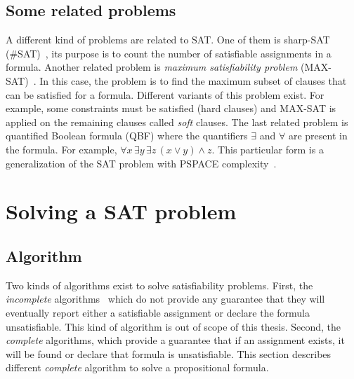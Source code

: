 \subsection{Some related problems}
A different kind of problems are related to SAT.
One of them is sharp-SAT (\#SAT)~\cite{valiant1979complexity}, its purpose is to count the number of satisfiable assignments in a formula.
Another related problem is \textit{maximum satisfiability problem} (MAX-SAT)~\cite{biere2009handbook}. In this case, the problem
is to find the maximum subset of clauses that can be satisfied for a formula. Different variants
of this problem exist. For example, some constraints must be satisfied (hard clauses) and MAX-SAT
is applied on the remaining clauses called \emph{soft} clauses.
The last related problem is quantified Boolean formula (QBF) where the quantifiers $\exists$ and
$\forall$ are present in the formula. For example, $\forall x\, \exists y\, \exists z \, (x \lor y) \land z$.
This particular form is a generalization of the SAT problem with PSPACE complexity~\cite{garey2002computers}.


\clearpage
\section{Solving a SAT problem}

\subsection{Algorithm}

Two kinds of algorithms exist to solve satisfiability problems.
First, the \emph{incomplete} algorithms~\cite{kautz2009incomplete} which do not provide any guarantee that they will eventually report
either a satisfiable assignment or declare the formula unsatisfiable. This kind of algorithm is out of scope of this thesis. 
Second, the \emph{complete} algorithms, which provide a guarantee that if an assignment exists,
it will be found or declare that formula is unsatisfiable.
This section describes different \emph{complete} algorithm to solve a propositional formula.
